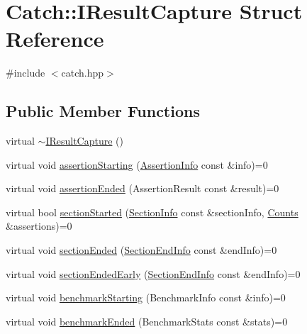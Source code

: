 \hypertarget{structCatch_1_1IResultCapture}{}\section{Catch\+:\+:I\+Result\+Capture Struct Reference}
\label{structCatch_1_1IResultCapture}


{\ttfamily \#include $<$catch.\+hpp$>$}

\subsection*{Public Member Functions}
\begin{DoxyCompactItemize}
\item 
virtual \mbox{\hyperlink{structCatch_1_1IResultCapture_a3bd16719d6772b7470887fc36c6d0808}{$\sim$\+I\+Result\+Capture}} ()
\item 
virtual void \mbox{\hyperlink{structCatch_1_1IResultCapture_af04a4d75346314376286633aba2a6614}{assertion\+Starting}} (\mbox{\hyperlink{structCatch_1_1AssertionInfo}{Assertion\+Info}} const \&info)=0
\item 
virtual void \mbox{\hyperlink{structCatch_1_1IResultCapture_ae45e08bccc5fb434656d4f2e44742223}{assertion\+Ended}} (Assertion\+Result const \&result)=0
\item 
virtual bool \mbox{\hyperlink{structCatch_1_1IResultCapture_a5b76ed52badcb64cf374202e12b81a03}{section\+Started}} (\mbox{\hyperlink{structCatch_1_1SectionInfo}{Section\+Info}} const \&section\+Info, \mbox{\hyperlink{structCatch_1_1Counts}{Counts}} \&assertions)=0
\item 
virtual void \mbox{\hyperlink{structCatch_1_1IResultCapture_a4e152bc43dc0933684e31fa67a58195d}{section\+Ended}} (\mbox{\hyperlink{structCatch_1_1SectionEndInfo}{Section\+End\+Info}} const \&end\+Info)=0
\item 
virtual void \mbox{\hyperlink{structCatch_1_1IResultCapture_afcc71eef8ca821ae132cced4a2be6988}{section\+Ended\+Early}} (\mbox{\hyperlink{structCatch_1_1SectionEndInfo}{Section\+End\+Info}} const \&end\+Info)=0
\item 
virtual void \mbox{\hyperlink{structCatch_1_1IResultCapture_a264ae12330c74b2daae41715a30d51bf}{benchmark\+Starting}} (Benchmark\+Info const \&info)=0
\item 
virtual void \mbox{\hyperlink{structCatch_1_1IResultCapture_a6e5e64f9d94211a888249012ab6cc7fb}{benchmark\+Ended}} (Benchmark\+Stats const \&stats)=0
\item 

\end{DoxyCompactItemize}
